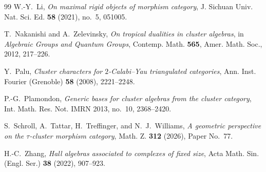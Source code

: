 \begin{thebibliography}{99}
W.-Y.~Li,
\emph{On maximal rigid objects of morphism category},
J. Sichuan Univ. Nat. Sci. Ed. \textbf{58} (2021), no.~5, 051005.

T.~Nakanishi and A.~Zelevinsky,
\emph{On tropical dualities in cluster algebras},
in \emph{Algebraic Groups and Quantum Groups}, Contemp. Math. \textbf{565},
Amer. Math. Soc., 2012, 217--226.

Y.~Palu,
\emph{Cluster characters for $2$-Calabi--Yau triangulated categories},
Ann. Inst. Fourier (Grenoble) \textbf{58} (2008), 2221--2248.

P.-G.~Plamondon,
\emph{Generic bases for cluster algebras from the cluster category},
Int. Math. Res. Not. IMRN 2013, no.~10, 2368--2420.

S.~Schroll, A.~Tattar, H.~Treffinger, and N.~J.~Williams,
\emph{A geometric perspective on the $\tau$-cluster morphism category},
Math. Z. \textbf{312} (2026), Paper No.~77.

H.-C.~Zhang,
\emph{Hall algebras associated to complexes of fixed size},
Acta Math. Sin. (Engl. Ser.) \textbf{38} (2022), 907--923.

\end{thebibliography}

